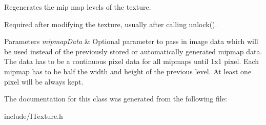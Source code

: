 Regenerates the mip map levels of the texture. 

Required after modifying the texture, usually after calling unlock(). 
\begin{DoxyParams}{Parameters}
{\em mipmap\+Data} & Optional parameter to pass in image data which will be used instead of the previously stored or automatically generated mipmap data. The data has to be a continuous pixel data for all mipmaps until 1x1 pixel. Each mipmap has to be half the width and height of the previous level. At least one pixel will be always kept. \\
\hline
\end{DoxyParams}


The documentation for this class was generated from the following file\+:\begin{DoxyCompactItemize}
\item 
include/I\+Texture.\+h\end{DoxyCompactItemize}
